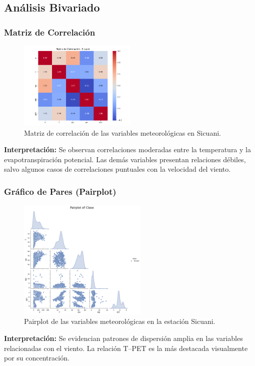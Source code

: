 \subsection{Análisis Bivariado}

\subsubsection*{Matriz de Correlación}
\begin{figure}[H]
\centering
\includegraphics[width=0.5\textwidth]{resultados/por_estacion_meteorologica/Sicuani/matriz_correlacion.png}
\caption{Matriz de correlación de las variables meteorológicas en Sicuani.}
\label{fig:sicuani_corr}
\end{figure}
\textbf{Interpretación:} Se observan correlaciones moderadas entre la temperatura y la evapotranspiración potencial. Las demás variables presentan relaciones débiles, salvo algunos casos de correlaciones puntuales con la velocidad del viento.

\subsubsection*{Gráfico de Pares (Pairplot)}
\begin{figure}[H]
\centering
\includegraphics[width=0.55\textwidth]{resultados/por_estacion_meteorologica/Sicuani/pairplot.png}
\caption{Pairplot de las variables meteorológicas en la estación Sicuani.}
\label{fig:sicuani_pairplot}
\end{figure}
\textbf{Interpretación:} Se evidencian patrones de dispersión amplia en las variables relacionadas con el viento. La relación T–PET es la más destacada visualmente por su concentración.



